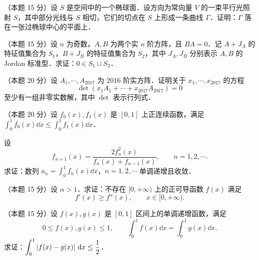 
\begin{problems}

\item[一、]（本题 15 分）设 $S$ 是空间中的一个椭球面．设方向为常向量 $V$ 的一束平行光照射 $S$，其中部分光线与 $S$ 相切，它们的切点在 $S$ 上形成一条曲线 $\Gamma$．证明：$\Gamma$ 落在一张过椭球中心的平面上．

\item[二、]（本题 15 分）设 $n$ 为奇数，$A,B$ 为两个实 $n$ 阶方阵，且 $BA=0$．记 $A+J_A$ 的特征值集合为 $S_1$，$B+J_B$ 的特征值集合为 $S_2$，其中 $J_A,J_B$ 分别表示 $A,B$ 的 Jordan 标准型．求证：$0\in S_1\cup S_2$．

\item[三、]（本题 20 分）设 $A_1,\cdots,A_{2017}$ 为 $2016$ 阶实方阵．证明关于 $x_1,\cdots,x_{2017}$ 的方程
\[
  \det(x_1A_1+\cdots+x_{2017}A_{2017})=0
\]
至少有一组非零实数解，其中 $\det$ 表示行列式．

\item[四、]（本题 20 分）设 $f_0(x),f_1(x)$ 是 $[0,1]$ 上正连续函数，满足 $\displaystyle\int_0^1 f_0(x)\dd x\le\int_0^1 f_1(x)\dd x$．

设
\[
  f_{n+1}(x)=\frac{2f_n^2(x)}{f_n(x)+f_{n-1}(x)},\qquad n=1,2,\cdots.
\]
求证：数列 $\displaystyle a_n=\int_0^1 f_n(x)\dd x$，$n=1,2,\cdots$ 单调递增且收敛．

\item[五、]（本题 15 分）设 $\alpha>1$．求证：不存在 $[0,+\infty)$ 上的正可导函数 $f(x)$ 满足
\begin{equation}
  f'(x)\ge f^{\alpha}(x),\qquad x\in[0,+\infty).\tag{1}
\end{equation}

\item[六、]（本题 15 分）设 $f(x),g(x)$ 是 $[0,1]$ 区间上的单调递增函数，满足
\[
  0\le f(x),g(x)\le 1,\qquad \int_0^1 f(x)\dd x=\int_0^1 g(x)\dd x.
\]
求证：$\displaystyle\int_0^1\left|f(x)-g(x)\right|\,\mathrm{d} x\le\frac{1}{2}$．

\end{problems}
